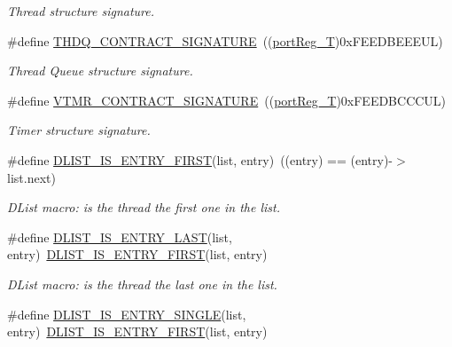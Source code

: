\begin{DoxyCompactItemize}
\begin{DoxyCompactList}\small\item\em Thread structure signature. \end{DoxyCompactList}\item 
\#define \hyperlink{group__kern__impl_ga756c92b6edae711c63d57f634a5b09f8}{T\-H\-D\-Q\-\_\-\-C\-O\-N\-T\-R\-A\-C\-T\-\_\-\-S\-I\-G\-N\-A\-T\-U\-R\-E}~((\hyperlink{group__template__cpu__intf_ga99980ab56ce9857e7380210d12e3d41f}{port\-Reg\-\_\-\-T})0x\-F\-E\-E\-D\-B\-E\-E\-E\-U\-L)
\begin{DoxyCompactList}\small\item\em Thread Queue structure signature. \end{DoxyCompactList}\item 
\#define \hyperlink{group__kern__impl_ga8b83b7d73295898ffe900f8f37dcb3a9}{V\-T\-M\-R\-\_\-\-C\-O\-N\-T\-R\-A\-C\-T\-\_\-\-S\-I\-G\-N\-A\-T\-U\-R\-E}~((\hyperlink{group__template__cpu__intf_ga99980ab56ce9857e7380210d12e3d41f}{port\-Reg\-\_\-\-T})0x\-F\-E\-E\-D\-B\-C\-C\-C\-U\-L)
\begin{DoxyCompactList}\small\item\em Timer structure signature. \end{DoxyCompactList}\item 
\#define \hyperlink{group__kern__impl_ga177fc11d78c08db1f70168bf971e0059}{D\-L\-I\-S\-T\-\_\-\-I\-S\-\_\-\-E\-N\-T\-R\-Y\-\_\-\-F\-I\-R\-S\-T}(list, entry)~((entry) == (entry)-\/$>$list.\-next)
\begin{DoxyCompactList}\small\item\em D\-List macro\-: is the thread the first one in the list. \end{DoxyCompactList}\item 
\#define \hyperlink{group__kern__impl_gaad48325fff9eb7b4c41788e190a28cf2}{D\-L\-I\-S\-T\-\_\-\-I\-S\-\_\-\-E\-N\-T\-R\-Y\-\_\-\-L\-A\-S\-T}(list, entry)~\hyperlink{group__kern__impl_ga177fc11d78c08db1f70168bf971e0059}{D\-L\-I\-S\-T\-\_\-\-I\-S\-\_\-\-E\-N\-T\-R\-Y\-\_\-\-F\-I\-R\-S\-T}(list, entry)
\begin{DoxyCompactList}\small\item\em D\-List macro\-: is the thread the last one in the list. \end{DoxyCompactList}\item 
\#define \hyperlink{group__kern__impl_ga77e64b5c52cb61e2bb7f6a4c6b0c9acc}{D\-L\-I\-S\-T\-\_\-\-I\-S\-\_\-\-E\-N\-T\-R\-Y\-\_\-\-S\-I\-N\-G\-L\-E}(list, entry)~\hyperlink{group__kern__impl_ga177fc11d78c08db1f70168bf971e0059}{D\-L\-I\-S\-T\-\_\-\-I\-S\-\_\-\-E\-N\-T\-R\-Y\-\_\-\-F\-I\-R\-S\-T}(list, entry)

\end{DoxyCompactItemize}
